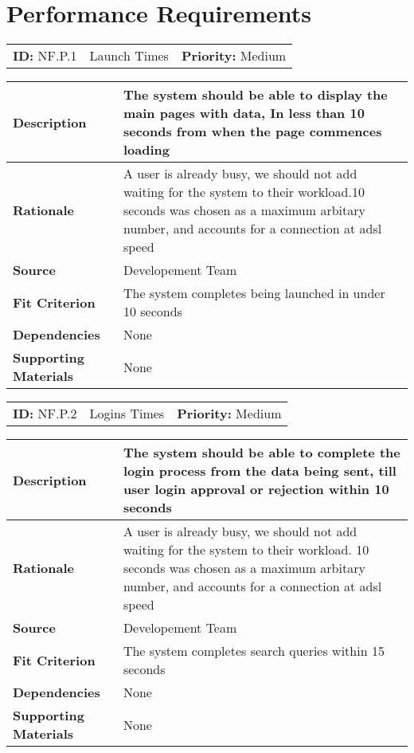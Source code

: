 \section{Performance Requirements}

\FloatBarrier

\begin{table}[H]
    \begin{tabularx}{\textwidth}{| l | X | l |}
        \hline
        \textbf{ID:} NF.P.1 & Launch Times & \textbf{Priority:} Medium \\
    \end{tabularx}
    \begin{tabularx}{\textwidth}{| l | X |}
        \hline
        \textbf{Description} & The system should be able to display the main pages with data, In less than 10 seconds from when the page commences loading\\ \hline
        \textbf{Rationale} & A user is already busy, we should not add waiting for the system to their workload.10 seconds was chosen as a maximum arbitary number, and accounts for a connection at adsl speed\\ \hline
        \textbf{Source} & Developement Team\\ \hline
        \textbf{Fit Criterion} & The system completes being launched in under 10 seconds\\ \hline
        \textbf{Dependencies} & None \\ \hline
        \textbf{Supporting Materials} & None \\ \hline
    \end{tabularx}
\end{table}

\begin{table}[H]
    \begin{tabularx}{\textwidth}{| l | X | l |}
        \hline
        \textbf{ID:} NF.P.2 & Logins Times & \textbf{Priority:} Medium \\
    \end{tabularx}
    \begin{tabularx}{\textwidth}{| l | X |}
        \hline
        \textbf{Description} & The system should be able to complete the login process from the data being sent, till user login approval or rejection within 10 seconds\\ \hline
        \textbf{Rationale} & A user is already busy, we should not add waiting for the system to their workload. 10 seconds was chosen as a maximum arbitary number, and accounts for a connection at adsl speed\\ \hline
        \textbf{Source} & Developement Team\\ \hline
        \textbf{Fit Criterion} & The system completes search queries within 15 seconds\\ \hline
        \textbf{Dependencies} & None \\ \hline
        \textbf{Supporting Materials} & None \\ \hline
    \end{tabularx}
\end{table}


